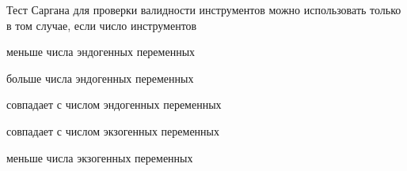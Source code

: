
\begin{question}
Тест Саргана для проверки валидности инструментов можно использовать
только в том случае, если число инструментов
\begin{answerlist}
  \item меньше числа эндогенных переменных
  \item больше числа эндогенных переменных
  \item совпадает с числом эндогенных переменных
  \item совпадает с числом экзогенных переменных
  \item меньше числа экзогенных переменных
\end{answerlist}
\end{question}



